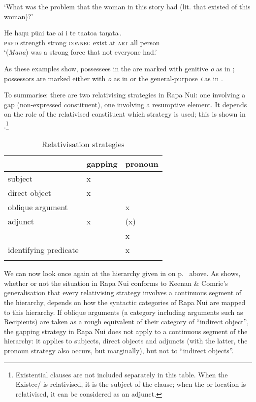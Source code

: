 \glt 
‘What was the problem that the woman in this story had (lit. that existed of this woman)?’ \textstyleExampleref{[R616.603]} 
\z

\ea\label{ex:11.109}
\gll He haŋu pūai {\ob}ta{\ꞌ}e ai i te ta{\ꞌ}ato{\ꞌ}a taŋata\,{\cb}. \\
\textsc{pred} strength strong {\db}\textsc{conneg} exist at \textsc{art} all person \\

\glt
‘(\textit{Mana}) was a strong force that not everyone had.’ \textstyleExampleref{[R634.002]} 
\z

As these examples show, possessees in the  are marked with genitive \textit{o} as in ; possessors are marked either with \textit{o} as in  or the general-purpose  \textit{i} as in . 

To summarise: there are two relativising strategies in Rapa Nui: one involving a gap (non-expressed constituent), one involving a resumptive element. It depends on the role of the relativised constituent which strategy is used; this is shown in .\footnote{\label{fn:514}Existential clauses are not included separately in this table. When the Existee/ is relativised, it is the subject of the clause; when the  or location is relativised, it can be considered as an adjunct.}

\begin{table}
\begin{tabularx}{.66\textwidth}{L{39mm}Z{15mm}Z{15mm}} 
\lsptoprule
& {gapping}& {pronoun}\\
\midrule
subject & x& \\
direct object & x& \\
oblique argument &  & x\\
adjunct & x& (x)\\
{} &  & x\\
identifying predicate &  & x\\
\lspbottomrule
\end{tabularx}
\caption{Relativisation strategies}
\label{tab:66}
\end{table}

We can now look once again at the  hierarchy given in  on p.~\pageref{ex:11.88a} above. As  shows, whether or not the situation in Rapa Nui conforms to Keenan \& Comrie’s generalisation that every relativising strategy involves a continuous segment of the hierarchy, depends on how the syntactic categories of Rapa Nui are mapped to this hierarchy. If oblique arguments (a category including arguments such as Recipients) are taken as a rough equivalent of their category of “indirect object”, the gapping strategy in Rapa Nui does not apply to a continuous segment of the hierarchy: it applies to subjects, direct objects and adjuncts (with the latter, the pronoun strategy also occurs, but marginally), but not to “indirect objects”.

